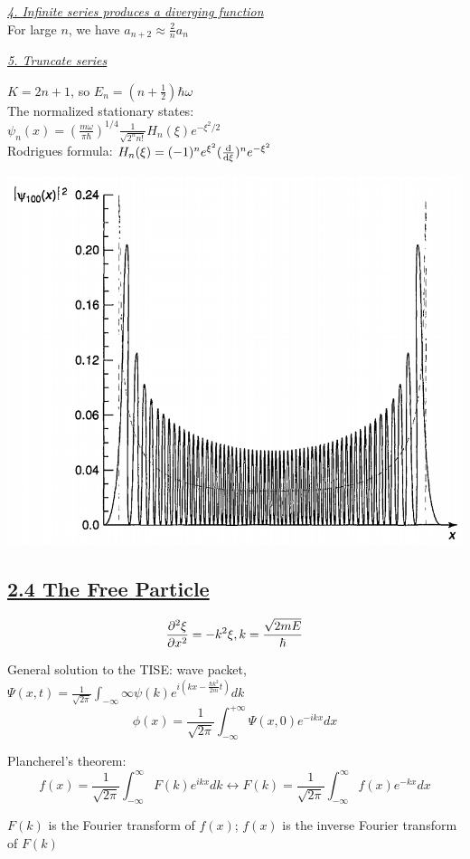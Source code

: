 \textit{\underline{4. Infinite series produces a diverging function}} \\

For large $n$, we have $a_{n+2} \approx \frac{2}{n} a_n$ 

\textit{\underline{5. Truncate series}}

\begin{vwcol}[widths={0.8,0.2},sep=0cm,rule=0pt,indent=0em]

$K = 2n + 1$, so $E_n = (n + \frac{1}{2}) \hbar \omega$ \\
The normalized stationary states: \\
$\psi_n(x) = (\frac{m \omega}{\pi \hbar})^{1/4} \frac{1}{\sqrt{2^n n!}} H_n(\xi) e^{-\xi^2 / 2}$ \\

Rodrigues formula: $H_n(\xi) = (-1)^n e^{\xi^2} (\dv{}{\xi})^n e^{-\xi^2}$

\columnbreak

\vspace{-1em}
\begin{Figure}
    \raggedright
    \includegraphics[width=0.2\columnwidth]{figures/harmonic_oscillator2.png}
\end{Figure}
\vspace{0em}

\end{vwcol}

\subsection{\underline{2.4 The Free Particle}}
$$\pdv[2]{\xi}{x} = -k^2 \xi, k = \frac{\sqrt{2mE}}{\hbar}$$

General solution to the TISE: wave packet, $\Psi(x, t) = \frac{1}{\sqrt{2\pi}} \int_{-\infty}{\infty} \psi(k) e^{i (kx - \frac{\hbar k^2}{2m} t)} dk$ \\
$$\phi(x) = \frac{1}{\sqrt{2 \pi}} \int_{-\infty}^{+\infty} \Psi(x, 0) e^{-ikx} dx$$

Plancherel's theorem: $$f(x) = \frac{1}{\sqrt{2 \pi}} \int_{-\infty}^{\infty} F(k) e^{ikx} dk \leftrightarrow F(k) = \frac{1}{\sqrt{2\pi}} \int_{-\infty}^{\infty} f(x) e^{-kx} dx$$

$F(k)$ is the Fourier transform of $f(x)$; $f(x)$ is the inverse Fourier transform of $F(k)$ \\

